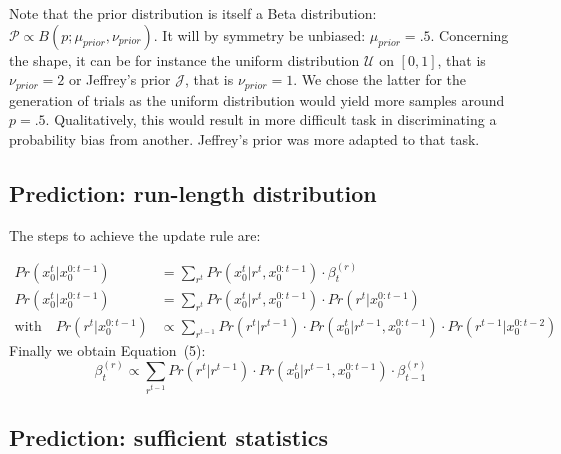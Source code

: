 \documentclass[10pt,letterpaper]{article}
\newcommand{\eq}[1]{\begin{equation*}#1\end{equation*}}
\newcommand{\eqs}[1]{\begin{align*}#1\end{align*}}
\newcommand{\Jj}{\mathcal{J}}
\newcommand{\Pp}{\mathcal{P}}
\newcommand{\Uu}{\mathcal{U}}
\newcommand{\seeEq}[1]{Equation~\ref{eq:#1}}
\begin{document}
%
%

%
%



Note that the prior distribution is itself a Beta distribution:
$\Pp\propto B(p; \mu_{prior}, \nu_{prior})$.
It will by symmetry be unbiased: $\mu_{prior}=.5$.
Concerning the shape, it can be for instance
the uniform distribution $\Uu$ on $ [ 0, 1 ] $, that is $\nu_{prior}=2$ or
Jeffrey's prior $\Jj$, that is $\nu_{prior}=1$.
We chose the latter for the generation of trials
as the uniform distribution would yield more samples around $p=.5$.
Qualitatively, this would result in more difficult task in discriminating a probability bias from another.
Jeffrey's prior was more adapted to that task.


\subsection{Prediction: run-length distribution}

The steps to achieve the update rule are:

 \eqs{
Pr(x_0^t | x_0^{0:t-1}) &= \sum_{r^{t}} Pr(x_0^t | r^{t}, x_0^{0:t-1}) \cdot  \beta^{(r)}_t \\
Pr(x_0^t | x_0^{0:t-1}) &= \sum_{r^{t}} Pr(x_0^t | r^{t}, x_0^{0:t-1}) \cdot  Pr(r^{t} | x_0^{0:t-1})\\
\text{with} \quad Pr(r^{t} | x_0^{0:t-1}) &\propto \sum_{r^{t-1}}  Pr(r^t | r^{t-1}) \cdot  Pr(x_0^t | r^{t-1}, x_0^{0:t-1}) \cdot  Pr(r^{t-1} | x_0^{0:t-2})
}
Finally we obtain Equation~(5): %
\eq{
\beta^{(r)}_t \propto \sum_{r^{t-1}}  Pr(r^t | r^{t-1}) \cdot  Pr(x_0^t | r^{t-1}, x_0^{0:t-1}) \cdot  \beta^{(r)}_{t-1}
}


\subsection{Prediction: sufficient statistics}
\end{document}
